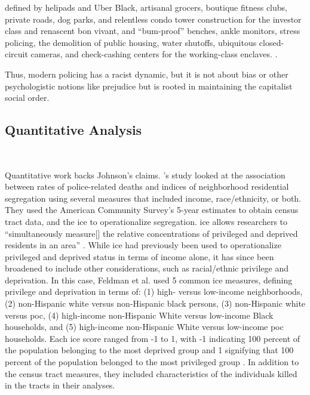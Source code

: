 \documentclass[12pt]{article}
\renewenvironment{quote}
  {\list{}{\leftmargin=\parindent\rightmargin=0pt}%
   \item\relax}
  {\endlist}
\begin{document}
\begin{quote}
defined by helipads and Uber Black, artisanal grocers, boutique fitness clubs, private roads, dog parks, and relentless condo tower construction for the investor class and renascent bon vivant, and “bum-proof” benches, ankle monitors, stress policing, the demolition of public housing, water shutoffs, ubiquitous closed-circuit cameras, and check-cashing centers for the working-class enclaves. \parencite[178]{johnsonTrumpismPolicingProblem2019}.
\end{quote}

Thus, modern policing has a racist dynamic, but it is not about bias or other psychologistic notions like prejudice but is rooted in maintaining the capitalist social order. 

\subsection{Quantitative Analysis}\

Quantitative work backs Johnson’s claims. \citeauthor{feldmanPoliceRelatedDeathsNeighborhood2019}'s \parencite*{feldmanPoliceRelatedDeathsNeighborhood2019} study looked at the association between rates of police-related deaths and indices of neighborhood residential segregation using several measures that included income, race/ethnicity, or both. They used the American Community Survey’s 5-year estimates to obtain census tract data, and the \acrfull{ice} to operationalize segregation. \acrshort{ice} allows researchers to “simultaneously measure[] the relative concentrations of privileged and deprived residents in an area” \parencite[459]{feldmanPoliceRelatedDeathsNeighborhood2019}. While \acrshort{ice} had previously been used to operationalize privileged and deprived status in terms of income alone, it has since been broadened to include other considerations, such as racial/ethnic privilege and deprivation. In this case, Feldman et al. used 5 common \acrshort{ice} measures, defining privilege and deprivation in terms of: (1) high- versus low-income neighborhoods, (2) non-Hispanic white versus non-Hispanic black persons, (3) non-Hispanic white versus \acrfull{poc}, (4) high-income non-Hispanic White versus low-income Black households, and (5) high-income non-Hispanic White versus low-income \acrshort{poc} households. Each \acrshort{ice} score ranged from -1 to 1, with -1 indicating 100 percent of the population belonging to the most deprived group and 1 signifying that 100 percent of the population belonged to the most privileged group \parencite[459]{feldmanPoliceRelatedDeathsNeighborhood2019}. In addition to the census tract measures, they included characteristics of the individuals killed in the tracts in their analyses.
\end{document}
